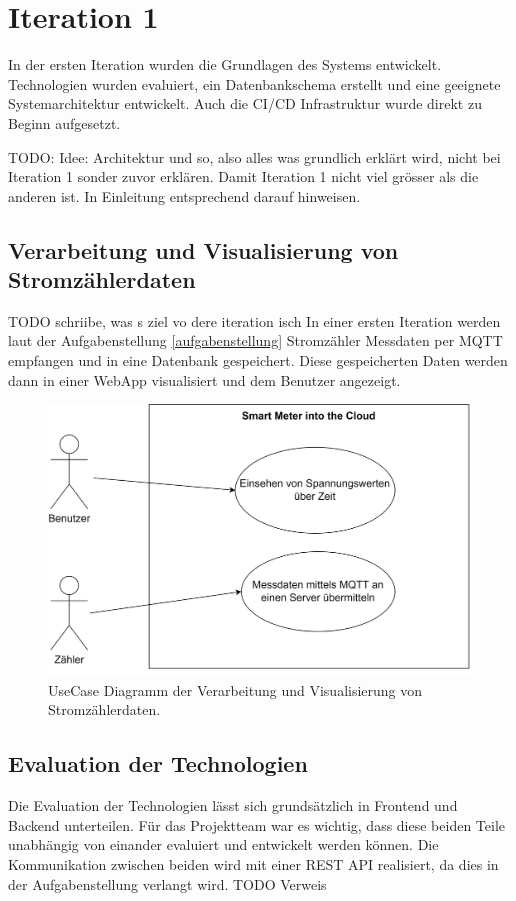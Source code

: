 \section{Iteration 1}
In der ersten Iteration wurden die Grundlagen des Systems entwickelt.
Technologien wurden evaluiert, ein Datenbankschema erstellt und eine geeignete Systemarchitektur entwickelt.
Auch die \ac{CI/CD} Infrastruktur wurde direkt zu Beginn aufgesetzt.

TODO: Idee: Architektur und so, also alles was grundlich erklärt wird, nicht bei Iteration 1 sonder zuvor erklären.
Damit Iteration 1 nicht viel grösser als die anderen ist. In Einleitung entsprechend darauf hinweisen.

\subsection{Verarbeitung und Visualisierung von Stromzählerdaten}
TODO schriibe, was s ziel vo dere iteration isch
In einer ersten Iteration werden laut der Aufgabenstellung \ref{aufgabenstellung} Stromzähler
Messdaten per \ac{MQTT} empfangen und in eine Datenbank gespeichert.
Diese gespeicherten Daten werden dann in einer WebApp visualisiert und dem Benutzer
angezeigt.

\begin{figure}[h]
    \centering
    \includegraphics[width=1.0\textwidth]{gfx/usecase1}
    \caption{
        UseCase Diagramm der Verarbeitung und Visualisierung von Stromzählerdaten.
    }
    \label{fig:usecase1}
\end{figure}

\subsection{Evaluation der Technologien}
\label{p1:evaluation_tech}
Die Evaluation der Technologien lässt sich grundsätzlich in Frontend und Backend unterteilen.
Für das Projektteam war es wichtig, dass diese beiden Teile unabhängig von einander evaluiert und entwickelt werden können.
Die Kommunikation zwischen beiden wird mit einer \ac{REST} \ac{API} realisiert, da dies in der Aufgabenstellung verlangt wird. TODO Verweis

